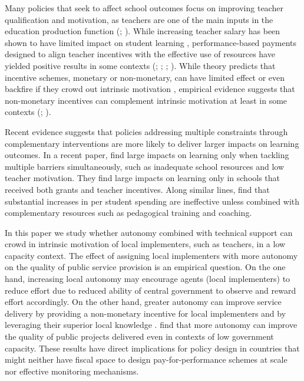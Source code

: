 \documentclass[11pt,a4paper]{article}
\begin{document}

Many policies that seek to affect school outcomes focus on improving teacher qualification and motivation, as teachers are one of the main inputs in the education production function (\citealp{hanushek2008role}; \citealp{chetty2014measuringI, chetty2014measuringII}). While increasing teacher salary has been shown to have limited impact on student learning \citep{de2018double}, performance-based payments designed to align teacher incentives with the effective use of resources have yielded positive results in some contexts (\citealp{muralidharan2011teacher}; \citealp{duflo2012incentives}; \citealp{de2018double}; \citealp{mbiti2019inputs}). While theory predicts that incentive schemes, monetary or non-monetary, can have limited effect or even backfire if they crowd out intrinsic motivation \citep{benabou2006incentives}, empirical evidence suggests that non-monetary incentives can complement intrinsic motivation at least in some contexts (\citealp{bowles2012economic}; \citealp{ashraf2014no}).


Recent evidence suggests that policies addressing multiple constraints through complementary interventions are more likely to deliver larger impacts on learning outcomes. In a recent paper, \cite{mbiti2019inputs} find large impacts on learning only when tackling multiple barriers simultaneously, such as inadequate school resources and low teacher motivation. They find large impacts on learning only in schools that received both grants and teacher incentives. Along similar lines, \cite{andrew2019preschool} find that substantial increases in per student spending are ineffective unless combined with complementary resources such as pedagogical training and coaching.



In this paper we study whether autonomy combined with technical support can crowd in intrinsic motivation of local implementers, such as teachers, in a low capacity context. The effect of assigning local implementers with more autonomy on the quality of public service provision is an empirical question. On the one hand, increasing local autonomy may encourage agents (local implementers) to reduce effort due to reduced ability of central government to observe and reward effort accordingly. On the other hand, greater autonomy can improve service delivery by providing a non-monetary incentive for local implementers and by leveraging their superior local knowledge \citep{rogger2018hierarchy}. \cite{rasul2018management} find that more autonomy can improve the quality of public projects delivered even in contexts of low government capacity. These results have direct implications for policy design in countries that might neither have fiscal space to design pay-for-performance schemes at scale nor effective monitoring mechanisms. 
\end{document}
